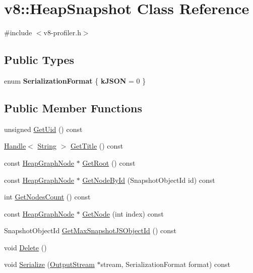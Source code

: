 \hypertarget{classv8_1_1HeapSnapshot}{}\section{v8\+:\+:Heap\+Snapshot Class Reference}
\label{classv8_1_1HeapSnapshot}


{\ttfamily \#include $<$v8-\/profiler.\+h$>$}

\subsection*{Public Types}
\begin{DoxyCompactItemize}
\item 
\hypertarget{classv8_1_1HeapSnapshot_a8ed7909568af85f7a36ef5f4da4dd495}{}enum {\bfseries Serialization\+Format} \{ {\bfseries k\+J\+S\+O\+N} = 0
 \}\label{classv8_1_1HeapSnapshot_a8ed7909568af85f7a36ef5f4da4dd495}

\end{DoxyCompactItemize}
\subsection*{Public Member Functions}
\begin{DoxyCompactItemize}
\item 
unsigned \hyperlink{classv8_1_1HeapSnapshot_a8096d1dc0b99fbffc0f0618be8472ca7}{Get\+Uid} () const 
\item 
\hyperlink{classv8_1_1Handle}{Handle}$<$ \hyperlink{classv8_1_1String}{String} $>$ \hyperlink{classv8_1_1HeapSnapshot_a54d5d9e0234c2ee361892ea598624a82}{Get\+Title} () const 
\item 
const \hyperlink{classv8_1_1HeapGraphNode}{Heap\+Graph\+Node} $\ast$ \hyperlink{classv8_1_1HeapSnapshot_aafd7abe35ce29f9874de6687c65bf2af}{Get\+Root} () const 
\item 
const \hyperlink{classv8_1_1HeapGraphNode}{Heap\+Graph\+Node} $\ast$ \hyperlink{classv8_1_1HeapSnapshot_a023696f94fe538380922bf2c40c97b7b}{Get\+Node\+By\+Id} (Snapshot\+Object\+Id id) const 
\item 
int \hyperlink{classv8_1_1HeapSnapshot_aaa2182a442eedf26d509cc3ddc623cc5}{Get\+Nodes\+Count} () const 
\item 
const \hyperlink{classv8_1_1HeapGraphNode}{Heap\+Graph\+Node} $\ast$ \hyperlink{classv8_1_1HeapSnapshot_ae67eb5a68dd648516f9d3879137d5c51}{Get\+Node} (int index) const 
\item 
Snapshot\+Object\+Id \hyperlink{classv8_1_1HeapSnapshot_a4a0fc79b7ef74a3a5ea3450b2354d8ed}{Get\+Max\+Snapshot\+J\+S\+Object\+Id} () const 
\item 
void \hyperlink{classv8_1_1HeapSnapshot_aeaa6073009e4041839dff7a860d2548a}{Delete} ()
\item 
void \hyperlink{classv8_1_1HeapSnapshot_acf7383deaa06fab1d948fd7e737ac7d3}{Serialize} (\hyperlink{classv8_1_1OutputStream}{Output\+Stream} $\ast$stream, Serialization\+Format format) const 
\end{DoxyCompactItemize}


